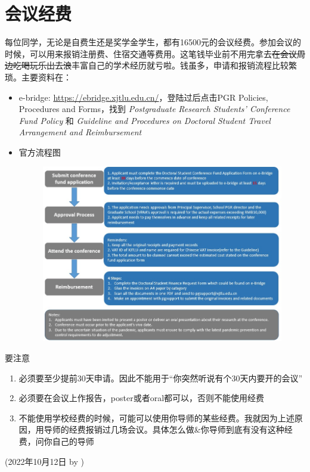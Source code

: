 \section{会议经费}
\label{sec.fund}

每位同学，无论是自费生还是奖学金学生，都有16500元的会议经费。参加会议的时候，可以用来报销注册费、住宿交通等费用。这笔钱毕业前不用完拿去\sout{在会议周边吃喝玩乐出去浪}丰富自己的学术经历就亏啦。钱虽多，申请和报销流程比较繁琐。主要资料在：
\begin{itemize}
    \item e-bridge: \url{https://ebridge.xjtlu.edu.cn/}，登陆过后点击PGR Policies, Procedures and Forms，找到 \textit{Postgraduate Research Students' Conference Fund Policy} 和 \textit{
    Guideline and Procedures on Doctoral Student Travel Arrangement and Reimbursement}
    \item 官方流程图
    \begin{figure}[H]
        \centering
        \includegraphics[width=0.9\columnwidth]{author-folder/Kai.Wu/fund-flowchart.jpg}
    \end{figure}
\end{itemize}

要注意
\begin{enumerate}
    \item 必须要至少提前30天申请。因此不能用于“你突然听说有个30天内要开的会议”
    \item 必须要在会议上作报告，poster或者oral都可以，否则不能使用经费
    \item 不能使用学校经费的时候，可能可以使用你导师的某些经费。我就因为上述原因，用导师的经费报销过几场会议。具体怎么做\&你导师到底有没有这种经费，问你自己的导师
\end{enumerate}


\begin{flushright}
(2022年10月12日 by \Wu)
\end{flushright}
